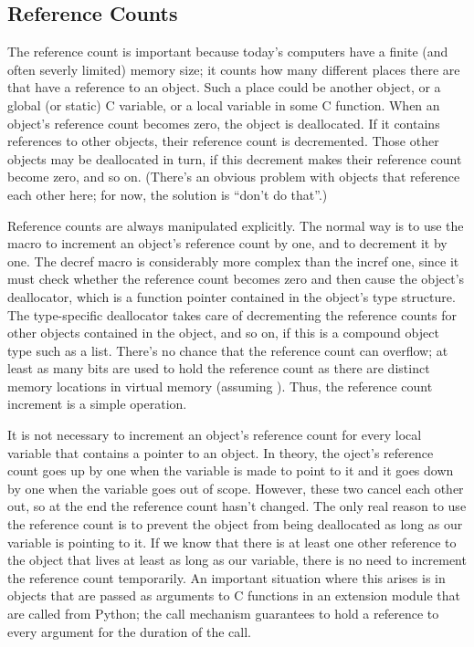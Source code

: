 \documentclass[twoside]{report}
\begin{document}
\subsection{Reference Counts}

The reference count is important because today's computers have a 
finite (and often severly limited) memory size; it counts how many 
different places there are that have a reference to an object.  Such a 
place could be another object, or a global (or static) C variable, or 
a local variable in some C function.  When an object's reference count 
becomes zero, the object is deallocated.  If it contains references to 
other objects, their reference count is decremented.  Those other 
objects may be deallocated in turn, if this decrement makes their 
reference count become zero, and so on.  (There's an obvious problem 
with objects that reference each other here; for now, the solution is 
``don't do that''.)

Reference counts are always manipulated explicitly.  The normal way is 
to use the macro  to increment an object's 
reference count by one, and  to decrement it by 
one.  The decref macro is considerably more complex than the incref one, 
since it must check whether the reference count becomes zero and then 
cause the object's deallocator, which is a function pointer contained 
in the object's type structure.  The type-specific deallocator takes 
care of decrementing the reference counts for other objects contained 
in the object, and so on, if this is a compound object type such as a 
list.  There's no chance that the reference count can overflow; at 
least as many bits are used to hold the reference count as there are 
distinct memory locations in virtual memory (assuming 
).  Thus, the reference count 
increment is a simple operation.

It is not necessary to increment an object's reference count for every 
local variable that contains a pointer to an object.  In theory, the 
oject's reference count goes up by one when the variable is made to 
point to it and it goes down by one when the variable goes out of 
scope.  However, these two cancel each other out, so at the end the 
reference count hasn't changed.  The only real reason to use the 
reference count is to prevent the object from being deallocated as 
long as our variable is pointing to it.  If we know that there is at 
least one other reference to the object that lives at least as long as 
our variable, there is no need to increment the reference count 
temporarily.  An important situation where this arises is in objects 
that are passed as arguments to C functions in an extension module 
that are called from Python; the call mechanism guarantees to hold a 
reference to every argument for the duration of the call.
\end{document}
